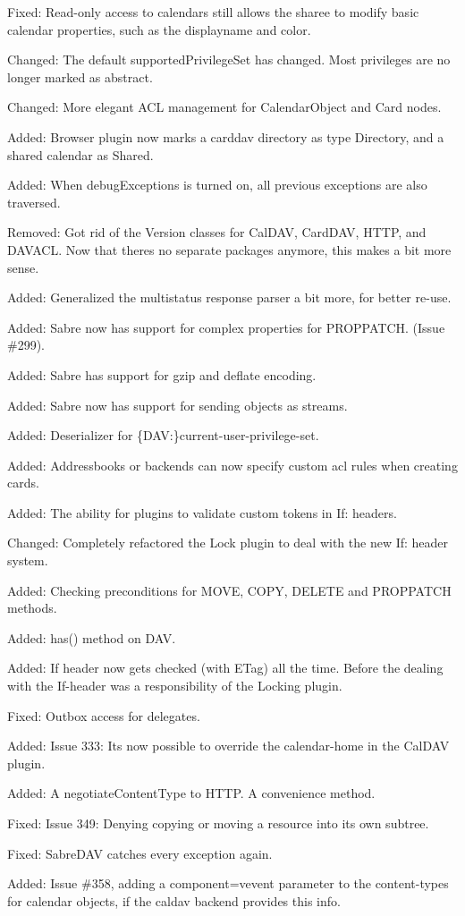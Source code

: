 \begin{DoxyItemize}
\item Fixed\+: Read-\/only access to calendars still allows the sharee to modify basic calendar properties, such as the displayname and color.
\item Changed\+: The default supported\+Privilege\+Set has changed. Most privileges are no longer marked as abstract.
\item Changed\+: More elegant A\+CL management for Calendar\+Object and Card nodes.
\item Added\+: Browser plugin now marks a carddav directory as type Directory, and a shared calendar as \textquotesingle{}Shared\textquotesingle{}.
\item Added\+: When debug\+Exceptions is turned on, all previous exceptions are also traversed.
\item Removed\+: Got rid of the Version classes for Cal\+D\+AV, Card\+D\+AV, H\+T\+TP, and D\+A\+V\+A\+CL. Now that there\textquotesingle{}s no separate packages anymore, this makes a bit more sense.
\item Added\+: Generalized the multistatus response parser a bit more, for better re-\/use.
\item Added\+: Sabre now has support for complex properties for P\+R\+O\+P\+P\+A\+T\+CH. (Issue \#299).
\item Added\+: Sabre has support for gzip and deflate encoding.
\item Added\+: Sabre now has support for sending objects as streams.
\item Added\+: Deserializer for \{D\+AV\+:\}current-\/user-\/privilege-\/set.
\item Added\+: Addressbooks or backends can now specify custom acl rules when creating cards.
\item Added\+: The ability for plugins to validate custom tokens in If\+: headers.
\item Changed\+: Completely refactored the Lock plugin to deal with the new If\+: header system.
\item Added\+: Checking preconditions for M\+O\+VE, C\+O\+PY, D\+E\+L\+E\+TE and P\+R\+O\+P\+P\+A\+T\+CH methods.
\item Added\+: has() method on D\+AV.
\item Added\+: If header now gets checked (with E\+Tag) all the time. Before the dealing with the If-\/header was a responsibility of the Locking plugin.
\item Fixed\+: Outbox access for delegates.
\item Added\+: Issue 333\+: It\textquotesingle{}s now possible to override the calendar-\/home in the Cal\+D\+AV plugin.
\item Added\+: A negotiate\+Content\+Type to H\+T\+TP. A convenience method.
\item Fixed\+: Issue 349\+: Denying copying or moving a resource into it\textquotesingle{}s own subtree.
\item Fixed\+: Sabre\+D\+AV catches every exception again.
\item Added\+: Issue \#358, adding a component=vevent parameter to the content-\/types for calendar objects, if the caldav backend provides this info.
\end{DoxyItemize}


